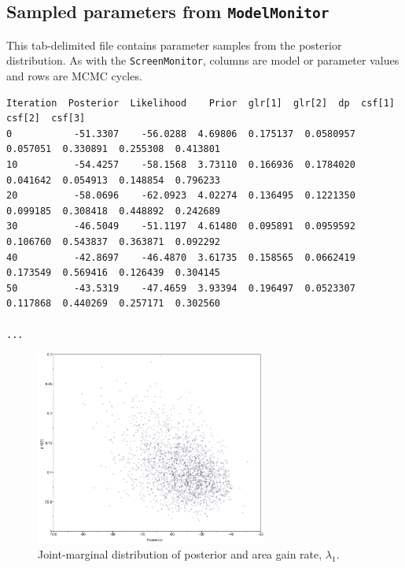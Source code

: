 \subsection{Sampled parameters from {\tt ModelMonitor}}

This tab-delimited file contains parameter samples from the posterior distribution.
As with the {\tt ScreenMonitor}, columns are model or parameter values and rows are MCMC cycles.

\begin{framed}
\begin{lstlisting}
Iteration  Posterior  Likelihood    Prior  glr[1]  glr[2]  dp  csf[1]  csf[2]  csf[3]
0           -51.3307    -56.0288  4.69806  0.175137  0.0580957  0.057051  0.330891  0.255308  0.413801
10          -54.4257    -58.1568  3.73110  0.166936  0.1784020  0.041642  0.054913  0.148854  0.796233
20          -58.0696    -62.0923  4.02274  0.136495  0.1221350  0.099185  0.308418  0.448892  0.242689
30          -46.5049    -51.1197  4.61480  0.095891  0.0959592  0.106760  0.543837  0.363871  0.092292
40          -42.8697    -46.4870  3.61735  0.158565  0.0662419  0.173549  0.569416  0.126439  0.304145
50          -43.5319    -47.4659  3.93394  0.196497  0.0523307  0.117868  0.440269  0.257171  0.302560

...
\end{lstlisting}
\end{framed}


\begin{figure}[H]
\centering
\includegraphics[width=3in]{../RB_Biogeography_Tutorial/figures/joint_rgain_posterior}
\caption{Joint-marginal distribution of posterior and area gain rate, $\lambda_1$.}
\end{figure}

